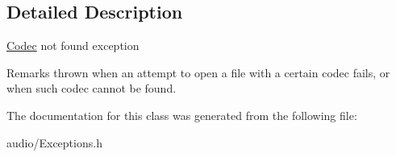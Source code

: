 \subsection{Detailed Description}
\hyperlink{classAudio_1_1Codec}{Codec} not found exception \begin{DoxyRemark}{Remarks}
thrown when an attempt to open a file with a certain codec fails, or when such codec cannot be found. 
\end{DoxyRemark}


The documentation for this class was generated from the following file\+:\begin{DoxyCompactItemize}
\item 
audio/Exceptions.\+h\end{DoxyCompactItemize}
